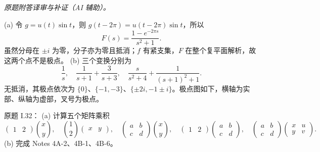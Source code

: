 \begin{solution}
\textit{原题附答译审与补证（AI 辅助）。}\par

(a) 令 $g=u(t)\sin t$，则 $g(t-2\pi)=u(t-2\pi)\sin t$，所以
\[F(s)=\frac{1-e^{-2\pi s}}{s^2+1}.\]
虽然分母在 $\pm i$ 为零，分子亦为零且抵消；$f$ 有紧支集，$F$ 在整个复平面解析，故这两个点不是极点。
(b) 三个变换分别为
\[\frac1s,\quad \frac1{s+1}+\frac3{s+3},\quad\frac{s}{s^2+4}+\frac1{(s+1)^2+1}.\]
无抵消，其极点依次为 $\{0\}$、$\{-1,-3\}$、$\{\pm2i,-1\pm i\}$。极点图如下，横轴为实部、纵轴为虚部，叉号为极点。
\begin{center}\end{center}
\end{solution}
\begin{exercise}\label{cw:ps8-I-32}原题 I.32：
(a) 计算五个矩阵乘积
\[\begin{pmatrix}1&2\end{pmatrix}\binom xy,\quad\binom12\begin{pmatrix}x&y\end{pmatrix},\quad\begin{pmatrix}a&b\\c&d\end{pmatrix}\binom xy,\quad\begin{pmatrix}1&2\end{pmatrix}\begin{pmatrix}a&b\\c&d\end{pmatrix},\quad\begin{pmatrix}a&b\\c&d\end{pmatrix}\begin{pmatrix}x&u\\y&v\end{pmatrix}.\]
(b) 完成 Notes 4A-2、4B-1、4B-6。\end{exercise}
